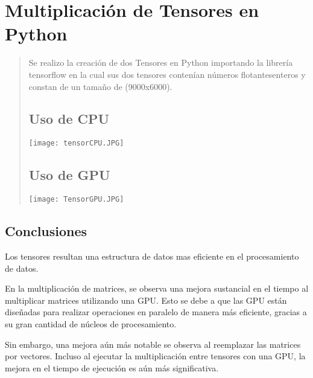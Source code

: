 \documentclass{article}
\begin{document}
\section{Multiplicación de Tensores en Python}
\begin{quote}
Se realizo la creación de dos Tensores en Python importando    la librería tensorflow en la cual sus dos tensores 
contenían números flotantesenteros  y constan de un tamaño de (9000x6000).

\subsection{Uso de CPU}
\texttt{[image: tensorCPU.JPG]}
\subsection{Uso de GPU}
\texttt{[image: TensorGPU.JPG]}

\end{quote}


\subsection{Conclusiones}
Los tensores resultan una estructura de datos mas eficiente en el procesamiento de datos.

En la multiplicación de matrices, se observa una mejora sustancial en el tiempo al multiplicar matrices utilizando una GPU. Esto se debe a que las GPU están diseñadas para realizar operaciones en paralelo de manera más eficiente, gracias a su gran cantidad de núcleos de procesamiento.

Sin embargo, una mejora aún más notable se observa al reemplazar las matrices por vectores. Incluso al ejecutar la multiplicación entre tensores con una GPU, la mejora en el tiempo de ejecución es aún más significativa.
\end{document}
